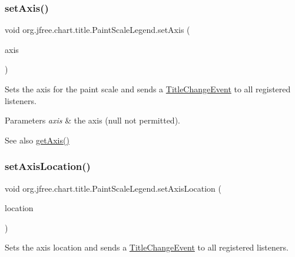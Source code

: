 \subsubsection{\texorpdfstring{set\+Axis()}{setAxis()}}
{\footnotesize\ttfamily void org.\+jfree.\+chart.\+title.\+Paint\+Scale\+Legend.\+set\+Axis (\begin{DoxyParamCaption}\item[{\mbox{\hyperlink{classorg_1_1jfree_1_1chart_1_1axis_1_1_value_axis}{Value\+Axis}}}]{axis }\end{DoxyParamCaption})}

Sets the axis for the paint scale and sends a \mbox{\hyperlink{}{Title\+Change\+Event}} to all registered listeners.


\begin{DoxyParams}{Parameters}
{\em axis} & the axis ({\ttfamily null} not permitted).\\
\hline
\end{DoxyParams}
\begin{DoxySeeAlso}{See also}
\mbox{\hyperlink{classorg_1_1jfree_1_1chart_1_1title_1_1_paint_scale_legend_a3bbd4958868cd03068068dd6c098df50}{get\+Axis()}} 
\end{DoxySeeAlso}
\mbox{\label{classorg_1_1jfree_1_1chart_1_1title_1_1_paint_scale_legend_a28c75f6f500d49d0bb28b0cf02334bea}} 
\subsubsection{\texorpdfstring{set\+Axis\+Location()}{setAxisLocation()}}
{\footnotesize\ttfamily void org.\+jfree.\+chart.\+title.\+Paint\+Scale\+Legend.\+set\+Axis\+Location (\begin{DoxyParamCaption}\item[{\mbox{\hyperlink{classorg_1_1jfree_1_1chart_1_1axis_1_1_axis_location}{Axis\+Location}}}]{location }\end{DoxyParamCaption})}

Sets the axis location and sends a \mbox{\hyperlink{}{Title\+Change\+Event}} to all registered listeners.


